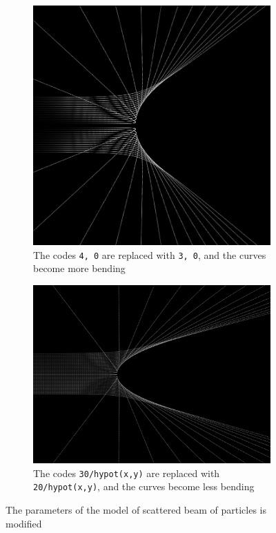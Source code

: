 \documentclass[12pt]{article}
\begin{document}
\begin{figure}[h]
  \centering
  \begin{subfigure}[b]{0.4\linewidth}
    \includegraphics[width=\linewidth]{distortion_scatter.png}
    \caption{The codes \texttt{4, 0} are replaced with \texttt{3, 0}, and the curves become more bending}
  \end{subfigure}
  \begin{subfigure}[b]{0.5\linewidth}
    \includegraphics[width=\linewidth]{distortion2_scatter.png}
    \caption{The codes \texttt{30/hypot(x,y)} are replaced with \texttt{20/hypot(x,y)}, and the curves become less bending}
  \end{subfigure}
  \caption{The parameters of the model of scattered beam of particles is modified}
  \label{fig:distortion_scatter}
\end{figure}
\end{document}

